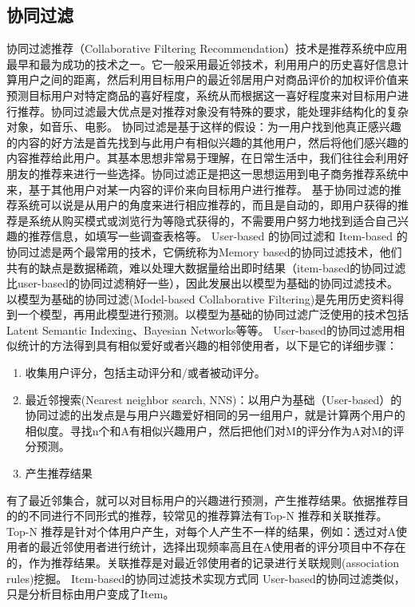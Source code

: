   \subsection{协同过滤}
  协同过滤推荐（Collaborative Filtering Recommendation）技术是推荐系统中应用最早和最为成功的技术之一。它一般采用最近邻技术，利用用户的历史喜好信息计算用户之间的距离，然后利用目标用户的最近邻居用户对商品评价的加权评价值来预测目标用户对特定商品的喜好程度，系统从而根据这一喜好程度来对目标用户进行推荐。协同过滤最大优点是对推荐对象没有特殊的要求，能处理非结构化的复杂对象，如音乐、电影。
  协同过滤是基于这样的假设：为一用户找到他真正感兴趣的内容的好方法是首先找到与此用户有相似兴趣的其他用户，然后将他们感兴趣的内容推荐给此用户。其基本思想非常易于理解，在日常生活中，我们往往会利用好朋友的推荐来进行一些选择。协同过滤正是把这一思想运用到电子商务推荐系统中来，基于其他用户对某一内容的评价来向目标用户进行推荐。
  基于协同过滤的推荐系统可以说是从用户的角度来进行相应推荐的，而且是自动的，即用户获得的推荐是系统从购买模式或浏览行为等隐式获得的，不需要用户努力地找到适合自己兴趣的推荐信息，如填写一些调查表格等。
  User-based 的协同过滤和 Item-based 的协同过滤是两个最常用的技术，它俩统称为Memory based的协同过滤技术，他们共有的缺点是数据稀疏，难以处理大数据量给出即时结果（item-based的协同过滤比user-based的协同过滤稍好一些），因此发展出以模型为基础的协同过滤技术。 以模型为基础的协同过滤(Model-based Collaborative Filtering)是先用历史资料得到一个模型，再用此模型进行预测。以模型为基础的协同过滤广泛使用的技术包括Latent Semantic Indexing、Bayesian Networks等等。
  User-based的协同过滤用相似统计的方法得到具有相似爱好或者兴趣的相邻使用者，以下是它的详细步骤：
  \begin{enumerate}
  \item 收集用户评分，包括主动评分和/或者被动评分。
  \item 最近邻搜索(Nearest neighbor search, NNS)：以用户为基础（User-based）的协同过滤的出发点是与用户兴趣爱好相同的另一组用户，就是计算两个用户的相似度。寻找n个和A有相似兴趣用户，然后把他们对M的评分作为A对M的评分预测。
  \item 产生推荐结果
  \end{enumerate}
  有了最近邻集合，就可以对目标用户的兴趣进行预测，产生推荐结果。依据推荐目的的不同进行不同形式的推荐，较常见的推荐算法有Top-N 推荐和关联推荐。Top-N 推荐是针对个体用户产生，对每个人产生不一样的结果，例如：透过对A使用者的最近邻使用者进行统计，选择出现频率高且在A使用者的评分项目中不存在的，作为推荐结果。关联推荐是对最近邻使用者的记录进行关联规则(association rules)挖掘。
  Item-based的协同过滤技术实现方式同 User-based的协同过滤类似，只是分析目标由用户变成了Item。


